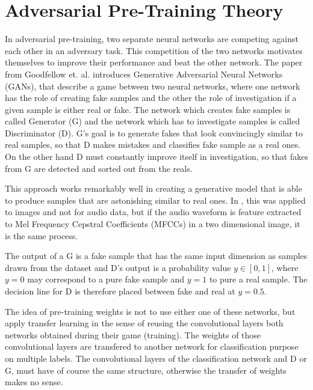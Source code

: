 
\section{Adversarial Pre-Training Theory}\label{sec:nn_adv}
\thesisStateNotReady
In adversarial pre-training, two separate neural networks are competing against each other in an adversary task.
This competition of the two networks motivates themselves to improve their performance and beat the other network.
The paper from Goodfellow et. al. \cite{Goodfellow2014} introduces Generative Adversarial Neural Networks (GANs), that describe a game between two neural networks, where one network has the role of creating fake samples and the other the role of investigation if a given sample is either real or fake.
The network which creates fake samples is called Generator (G) and the network which has to investigate samples is called Discriminator (D).
G's goal is to generate fakes that look convincingly similar to real samples, so that D makes mistakes and classifies fake sample as a real ones.
On the other hand D must constantly improve itself in investigation, so that fakes from G are detected and sorted out from the reals.

This approach works remarkably well in creating a generative model that is able to produce samples that are astonishing similar to real ones.
In \cite{Goodfellow2014}, this was applied to images and not for audio data, but if the audio waveform is feature extracted to Mel Frequency Cepstral Coefficients (MFCCs) in a two dimensional image, it is the same process.

The output of a G is a fake sample that has the same input dimension as samples drawn from the dataset and D's output is a probability value $y \in [0, 1]$, where $y = 0$ may correspond to a pure fake sample and $y = 1$ to pure a real sample.
The decision line for D is therefore placed between fake and real at $y = 0.5$.

The idea of pre-training weights is not to use either one of these networks, but apply transfer learning in the sense of reusing the convolutional layers both networks obtained during their game (training).
The weights of those convolutional layers are transfered to another network for classification purpose on multiple labels.
The convolutional layers of the classification network and D or G, must have of course the same structure, otherwise the transfer of weights makes no sense.

